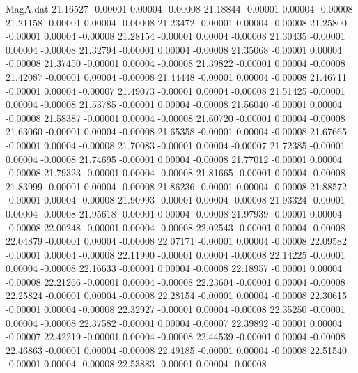 \begin{filecontents}{MagA.dat}
  21.16527   -0.00001    0.00004   -0.00008
  21.18844   -0.00001    0.00004   -0.00008
  21.21158   -0.00001    0.00004   -0.00008
  21.23472   -0.00001    0.00004   -0.00008
  21.25800   -0.00001    0.00004   -0.00008
  21.28154   -0.00001    0.00004   -0.00008
  21.30435   -0.00001    0.00004   -0.00008
  21.32794   -0.00001    0.00004   -0.00008
  21.35068   -0.00001    0.00004   -0.00008
  21.37450   -0.00001    0.00004   -0.00008
  21.39822   -0.00001    0.00004   -0.00008
  21.42087   -0.00001    0.00004   -0.00008
  21.44448   -0.00001    0.00004   -0.00008
  21.46711   -0.00001    0.00004   -0.00007
  21.49073   -0.00001    0.00004   -0.00008
  21.51425   -0.00001    0.00004   -0.00008
  21.53785   -0.00001    0.00004   -0.00008
  21.56040   -0.00001    0.00004   -0.00008
  21.58387   -0.00001    0.00004   -0.00008
  21.60720   -0.00001    0.00004   -0.00008
  21.63060   -0.00001    0.00004   -0.00008
  21.65358   -0.00001    0.00004   -0.00008
  21.67665   -0.00001    0.00004   -0.00008
  21.70083   -0.00001    0.00004   -0.00007
  21.72385   -0.00001    0.00004   -0.00008
  21.74695   -0.00001    0.00004   -0.00008
  21.77012   -0.00001    0.00004   -0.00008
  21.79323   -0.00001    0.00004   -0.00008
  21.81665   -0.00001    0.00004   -0.00008
  21.83999   -0.00001    0.00004   -0.00008
  21.86236   -0.00001    0.00004   -0.00008
  21.88572   -0.00001    0.00004   -0.00008
  21.90993   -0.00001    0.00004   -0.00008
  21.93324   -0.00001    0.00004   -0.00008
  21.95618   -0.00001    0.00004   -0.00008
  21.97939   -0.00001    0.00004   -0.00008
  22.00248   -0.00001    0.00004   -0.00008
  22.02543   -0.00001    0.00004   -0.00008
  22.04879   -0.00001    0.00004   -0.00008
  22.07171   -0.00001    0.00004   -0.00008
  22.09582   -0.00001    0.00004   -0.00008
  22.11990   -0.00001    0.00004   -0.00008
  22.14225   -0.00001    0.00004   -0.00008
  22.16633   -0.00001    0.00004   -0.00008
  22.18957   -0.00001    0.00004   -0.00008
  22.21266   -0.00001    0.00004   -0.00008
  22.23604   -0.00001    0.00004   -0.00008
  22.25824   -0.00001    0.00004   -0.00008
  22.28154   -0.00001    0.00004   -0.00008
  22.30615   -0.00001    0.00004   -0.00008
  22.32927   -0.00001    0.00004   -0.00008
  22.35250   -0.00001    0.00004   -0.00008
  22.37582   -0.00001    0.00004   -0.00007
  22.39892   -0.00001    0.00004   -0.00007
  22.42219   -0.00001    0.00004   -0.00008
  22.44539   -0.00001    0.00004   -0.00008
  22.46863   -0.00001    0.00004   -0.00008
  22.49185   -0.00001    0.00004   -0.00008
  22.51540   -0.00001    0.00004   -0.00008
  22.53883   -0.00001    0.00004   -0.00008

\end{filecontents}
